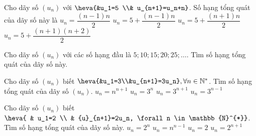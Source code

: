 \begin{ex}%
	Cho dãy số $(u_n)$ với $\heva{&u_1=5 \\& u_{n+1}=u_n+n}$. Số hạng tổng quát của  dãy số này là
	\choice 
		 {$u_n=\dfrac{(n-1)n}{2}$}
		 {\True $u_n=5+\dfrac{(n-1)n}{2}$}
		{$u_n=5+\dfrac{(n+1)n}{2}$} 
		{$u_n=5+\dfrac{(n+1)(n+2)}{2}$} 
\end{ex}

\begin{ex}%
	Cho dãy số $(u_n)$ với các số hạng đầu là $5;10;15;20;25;\ldots$. Tìm số hạng tổng quát của dãy số này. 
\end{ex}

\begin{ex}%
	Cho dãy  số $(u_n)$ biết $\heva{&u_1=3\\&u_{n+1}=3u_n},\forall n\in \mathbb{N}^*$. Tìm số hạng tổng quát của dãy số $(u_n)$.
	\choice 
		{$u_n=n^{n+1}$} 
		{\True $u_n=3^n$} 
		{$u_n=3^{n+1}$} 
		 {$u_n=3^{n-1}$}
\end{ex}

\begin{ex}%
	Cho  dãy số $\left(u_n\right)$ biết $\heva{
	& u_1=2 \\ 
	& {u}_{n+1}=2u_n, \forall n  \in \mathbb{N}^{*}}$. Tìm số hạng tổng quát của dãy số này.
	 \choice
		{\True  $u_n=2^n$}
		 {$u_n={n}^{n-1}$}
		 {$u_n=2$}
		{$u_n={2}^{n+1}$} 
\end{ex}

